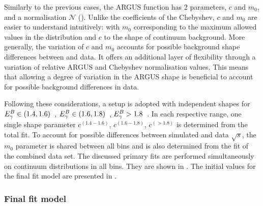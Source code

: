 Similarly to the previous cases, the ARGUS function has 2 parameters, $c$ and $m_0$, and a normalisation $\mathcal{N}$ ().
Unlike the coefficients of the Chebyshev, $c$ and $m_0$ are easier to understand intuitively: with $m_0$ corresponding to the maximum allowed \Mbc values in the distribution and $c$ to the shape of continuum background.
More generally, the variation of $c$ and $m_0$ accounts for possible background shape differences between \MC and data.
It offers an additional layer of flexibility through a variation of relative ARGUS and Chebyshev normalisation values.
This means that allowing a degree of variation in the ARGUS shape is beneficial to account for possible background differences in data.

Following these considerations, a setup is adopted with independent shapes for  \mbox{${E^B_{\gamma}}\in(1.4,1.6)$~\gev}, \mbox{${E^B_{\gamma}}\in(1.6,1.8)$~\gev}, ${E^B_{\gamma}}>1.8$~\gev.
In each respective range, one single shape parameter $c^{(1.4-1.6)}$, $c^{(1.6-1.8)}$, $c^{(>1.8)}$ is determined from the total fit.
To account for possible differences between simulated and data $\sqrt{s}$, the $m_0$ parameter is shared between all bins and is also determined from the fit of the combined data set.
The discussed primary fits are performed simultaneously on continuum \Mbc distributions in all \EB bins.
They are shown in .
The initial values for the final \Mbc fit model are presented in .

\subsubsection{Final fit model}

